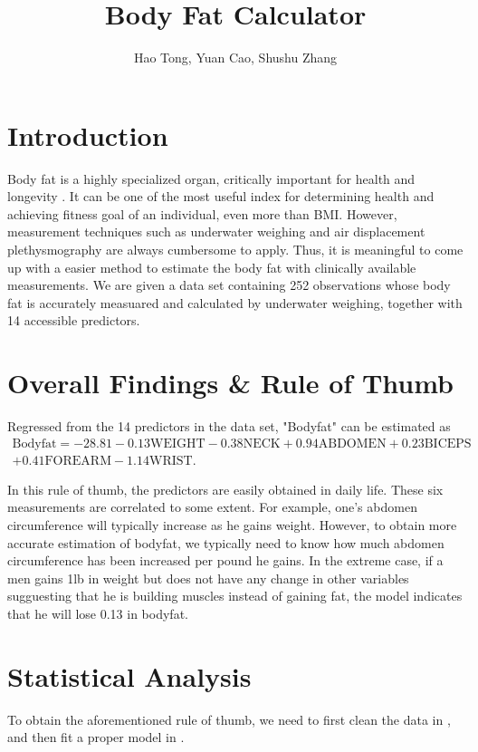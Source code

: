 \documentclass[11pt, letterpaper]{article}
\title{Body Fat Calculator}
\author{Hao Tong, Yuan Cao, Shushu Zhang}
\begin{document}
\maketitle

\section{Introduction}
\label{sec:1}
Body fat is a highly specialized organ, critically important for health and longevity \cite{ludwig2016always}. It can be one of the most useful index for determining health and achieving fitness goal of an individual, even more than BMI. However, measurement techniques such as underwater weighing and air displacement plethysmography are always cumbersome to apply. Thus, it is meaningful to come up with a easier method to estimate the body fat with clinically available measurements. We are given a data set containing 252 observations whose body fat is accurately measuared and calculated by underwater weighing, together with 14 accessible predictors. 

\section{Overall Findings \& Rule of Thumb}
\label{sec:2}
Regressed from the 14 predictors in the data set, "Bodyfat" can be estimated as
\begin{equation}\label{eq:model}
\begin{aligned}
\mathrm{Bodyfat}=
-28.81-0.13\mathrm{WEIGHT}-0.38\mathrm{NECK}+0.94\mathrm{ABDOMEN}+0.23\mathrm{BICEPS}\\
+0.41\mathrm{FOREARM}-1.14\mathrm{WRIST}.
\end{aligned}
\end{equation}
 
In this rule of thumb, the predictors are easily obtained in daily life. These six measurements are correlated to some extent. For example, one's abdomen circumference will typically increase as he gains weight. However, to obtain more accurate estimation of bodyfat, we typically need to know how much abdomen circumference has been increased per pound he gains. In the extreme case, if a men gains 1lb in weight but does not have any change in other variables sugguesting that he is building muscles instead of gaining fat, the model indicates that he will lose 0.13 in bodyfat. 


\section{Statistical Analysis}
\label{sec:3}
To obtain the aforementioned rule of thumb, we need to first clean the data in , and then fit a proper model in . 
\end{document}
